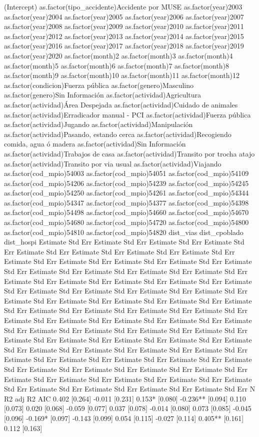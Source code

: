 (Intercept)  as.factor(tipo_accidente)Accidente por MUSE  as.factor(year)2003  as.factor(year)2004  as.factor(year)2005  as.factor(year)2006  as.factor(year)2007  as.factor(year)2008  as.factor(year)2009  as.factor(year)2010  as.factor(year)2011  as.factor(year)2012  as.factor(year)2013  as.factor(year)2014  as.factor(year)2015  as.factor(year)2016  as.factor(year)2017  as.factor(year)2018  as.factor(year)2019  as.factor(year)2020  as.factor(month)2  as.factor(month)3  as.factor(month)4  as.factor(month)5  as.factor(month)6  as.factor(month)7  as.factor(month)8  as.factor(month)9  as.factor(month)10  as.factor(month)11  as.factor(month)12  as.factor(condicion)Fuerza pública  as.factor(genero)Masculino  as.factor(genero)Sin Información  as.factor(actividad)Agricultura  as.factor(actividad)Área Despejada  as.factor(actividad)Cuidado de animales  as.factor(actividad)Erradicador manual - PCI  as.factor(actividad)Fuerza pública  as.factor(actividad)Jugando  as.factor(actividad)Manipulación  as.factor(actividad)Pasando, estando cerca  as.factor(actividad)Recogiendo comida, agua ó  madera  as.factor(actividad)Sin Información  as.factor(actividad)Trabajos de casa  as.factor(actividad)Transito por trocha atajo  as.factor(actividad)Transito por via usual  as.factor(actividad)Viajando  as.factor(cod_mpio)54003  as.factor(cod_mpio)54051  as.factor(cod_mpio)54109  as.factor(cod_mpio)54206  as.factor(cod_mpio)54239  as.factor(cod_mpio)54245  as.factor(cod_mpio)54250  as.factor(cod_mpio)54261  as.factor(cod_mpio)54344  as.factor(cod_mpio)54347  as.factor(cod_mpio)54377  as.factor(cod_mpio)54398  as.factor(cod_mpio)54498  as.factor(cod_mpio)54660  as.factor(cod_mpio)54670  as.factor(cod_mpio)54680  as.factor(cod_mpio)54720  as.factor(cod_mpio)54800  as.factor(cod_mpio)54810  as.factor(cod_mpio)54820  dist_vias  dist_cpoblado  dist_hospi      Estimate Std Err Estimate Std Err Estimate Std Err Estimate Std Err Estimate Std Err Estimate Std Err Estimate Std Err Estimate Std Err Estimate Std Err Estimate Std Err Estimate Std Err Estimate Std Err Estimate Std Err Estimate Std Err Estimate Std Err Estimate Std Err Estimate Std Err Estimate Std Err Estimate Std Err Estimate Std Err Estimate Std Err Estimate Std Err Estimate Std Err Estimate Std Err Estimate Std Err Estimate Std Err Estimate Std Err Estimate Std Err Estimate Std Err Estimate Std Err Estimate Std Err Estimate Std Err Estimate Std Err Estimate Std Err Estimate Std Err Estimate Std Err Estimate Std Err Estimate Std Err Estimate Std Err Estimate Std Err Estimate Std Err Estimate Std Err Estimate Std Err Estimate Std Err Estimate Std Err Estimate Std Err Estimate Std Err Estimate Std Err Estimate Std Err Estimate Std Err Estimate Std Err Estimate Std Err Estimate Std Err Estimate Std Err Estimate Std Err Estimate Std Err Estimate Std Err Estimate Std Err Estimate Std Err Estimate Std Err Estimate Std Err Estimate Std Err Estimate Std Err Estimate Std Err Estimate Std Err Estimate Std Err Estimate Std Err Estimate Std Err Estimate Std Err Estimate Std Err Estimate Std Err N R2 adj R2 AIC 0.402 [0.264] -0.011 [0.231] 0.153* [0.080] -0.236** [0.094] 0.110 [0.073] 0.020 [0.068] -0.059 [0.077] 0.037 [0.078] -0.014 [0.080] 0.073 [0.085] -0.045 [0.096] -0.169* [0.097] -0.143 [0.099] 0.054 [0.115] -0.027 [0.114] 0.405** [0.161] 0.112 [0.163] 